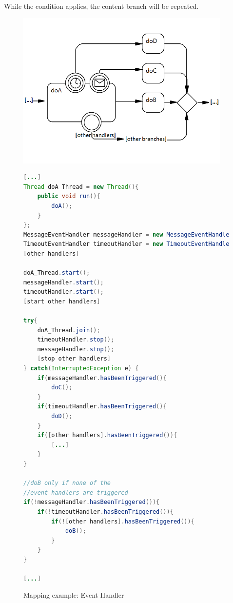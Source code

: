While the condition applies, the content branch will be repeated. 

\begin{figure}[h]
\begin{minipage}[c]{0.45\textwidth}
	\includegraphics[width=0.95\textwidth]{images/mapping/event_handler.png}
\end{minipage}
\begin{minipage}[c]{0.55\textwidth}
\begin{lstlisting}[language=Java]
[...]
Thread doA_Thread = new Thread(){
	public void run(){
		doA();
	}
};
MessageEventHandler messageHandler = new MessageEventHandler(doA_Thread);
TimeoutEventHandler timeoutHandler = new TimeoutEventHandler(20000, doA_Thread);
[other handlers]

doA_Thread.start();
messageHandler.start();
timeoutHandler.start();
[start other handlers]

try{
	doA_Thread.join();
	timeoutHandler.stop();
	messageHandler.stop();
	[stop other handlers]
} catch(InterruptedException e) {
	if(messageHandler.hasBeenTriggered(){
		doC();
	}
	if(timeoutHandler.hasBeenTriggered(){
		doD();
	}
	if([other handlers].hasBeenTriggered()){
		[...]
	}
}

//doB only if none of the 
//event handlers are triggered
if(!messageHandler.hasBeenTriggered()){
	if(!timeoutHandler.hasBeenTriggered()){
		if(![other handlers].hasBeenTriggered()){	
			doB(); 
		}
	}
}

[...]
\end{lstlisting}
\end{minipage}
\caption{Mapping example: Event Handler}%
\label{fig:mapping_eventhandler}%
\end{figure}

